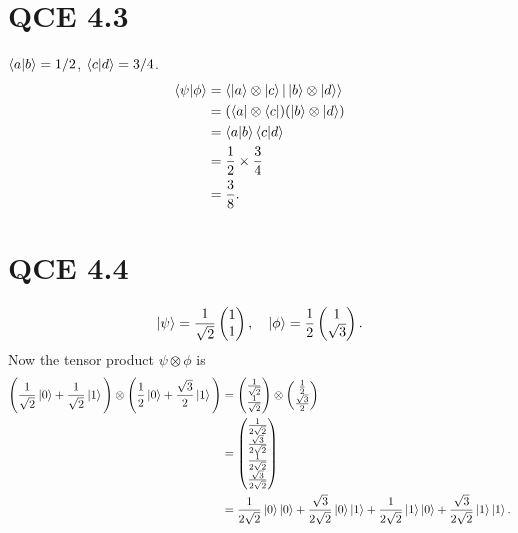 \documentclass[10pt]{article}
\begin{document}
\section*{QCE 4.3}
$\braket{a | b} = 1/2$, $\braket{c | d} = 3/4$. 
\begin{align*}
\braket{ \psi | \phi} &= \braket{ \ket{a} \otimes \ket{c} | \ket{b} \otimes \ket{d} } \\
								&= (\bra{a} \otimes \bra{c}) ( \ket{b} \otimes \ket{d} ) \\
								&= \braket{a | b} \braket{c | d} \\
								&= \frac{1}{2} \times \frac{3}{4} \\
								&= \frac{3}{8}.
\end{align*}

\section*{QCE 4.4}
\[
\ket{\psi} = \frac{1}{\sqrt{2}} \begin{pmatrix}
1 \\
1
\end{pmatrix}, \quad \ket{\phi} = \frac{1}{2} \begin{pmatrix}
1 \\
\sqrt{3}
\end{pmatrix}.
\]
Now the tensor product $\psi \otimes \phi$ is 
\begin{align*}
\Bigg( \frac{1}{\sqrt{2}} \ket{0} + \frac{1}{\sqrt{2}} \ket{1} \Bigg) \otimes \Bigg( \frac{1}{2} \ket{0} + \frac{\sqrt{3}}{2} \ket{1} \Bigg) &=
\begin{pmatrix}
\frac{1}{\sqrt{2}} \\
\frac{1}{\sqrt{2}} 
\end{pmatrix}
\otimes 
\begin{pmatrix}
\frac{1}{2} \\
\frac{\sqrt{3}}{2}
\end{pmatrix} \\
   &=
\begin{pmatrix}
\frac{1}{2\sqrt{2}}  \\
\frac{\sqrt{3}}{2 \sqrt{2}}  \\
\frac{1}{2\sqrt{2}}  \\
\frac{\sqrt{3}}{2\sqrt{2}}
\end{pmatrix} \\
  &= 
\frac{1}{2\sqrt{2}} \ket{0} \ket{0} + \frac{\sqrt{3}}{2\sqrt{2}} \ket{0} \ket{1} + \frac{1}{2\sqrt{2}} \ket{1} \ket{0} + \frac{\sqrt{3}}{2\sqrt{2}} \ket{1} \ket{1}.
\end{align*}
\end{document}
